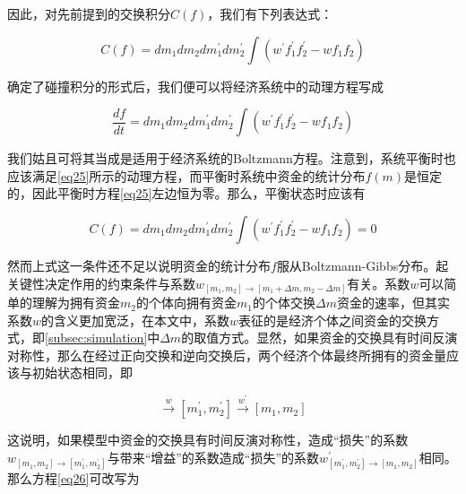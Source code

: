 \documentclass[tsinghuacite]{HustGraduPaper}
\begin{document}
		因此，对先前提到的交换积分$C(f)$，我们有下列表达式：
		
		\begin{equation}
			C(f) = dm_1 dm_2 dm_1^{'} dm_2^{'} \int  ( w^{'} f_{1}^{'} f_{2}^{'} - w f_{1} f_{2} )   \label{eq24}
		\end{equation}
		
		\vspace{1.5em}  
		
		确定了碰撞积分的形式后，我们便可以将经济系统中的动理方程写成
		
		\begin{equation}
			\frac{df}{dt} = dm_1 dm_2 dm_1^{'} dm_2^{'} \int  ( w^{'} f_{1}^{'} f_{2}^{'} - w f_{1} f_{2} )   \label{eq25}
		\end{equation}
		
		\vspace{1.5em}  
		
		我们姑且可将其当成是适用于经济系统的Boltzmann方程。注意到，系统平衡时也应该满足\eqref{eq25}所示的动理方程，而平衡时系统中资金的统计分布$f(m)$是恒定的，因此平衡时方程\eqref{eq25}左边恒为零。那么，平衡状态时应该有
		
		\begin{equation}
			C(f) = dm_1 dm_2 dm_1^{'} dm_2^{'} \int  ( w^{'} f_{1}^{'} f_{2}^{'} - w f_{1} f_{2} ) = 0  \label{eq26}
		\end{equation}
		
		\vspace{1.5em}  
		
		然而上式这一条件还不足以说明资金的统计分布$f$服从Boltzmann-Gibbs分布。起关键性决定作用的约束条件与系数$w_{[m_1,m_2] \rightarrow [m_1 + \Delta m, m_2 - \Delta m]}$有关。系数$w$可以简单的理解为拥有资金$m_2$的个体向拥有资金$m_1$的个体交换$\Delta m$资金的速率，但其实系数$w$的含义更加宽泛，在本文中，系数$w$表征的是经济个体之间资金的交换方式，即\autoref{subsec:simulation}中$\Delta m$的取值方式。显然，如果资金的交换具有时间反演对称性，那么在经过正向交换和逆向交换后，两个经济个体最终所拥有的资金量应该与初始状态相同，即
		
		\begin{equation}
			[m_1,m_2] \stackrel{w}{\longrightarrow} [m_1^{'}, m_2^{'}]  \stackrel{w^{'}}{\longrightarrow}   [m_1, m_2]  \label{eq27}
		\end{equation}
	
		\vspace{1.5em} 
		
		这说明，如果模型中资金的交换具有时间反演对称性，造成“损失”的系数$w_{[m_1, m_2]\rightarrow[m_1^{'}, m_2^{'}]}$与带来“增益”的系数造成“损失”的系数$w^{'}_{ [m_1^{'}, m_2^{'}] \rightarrow [m_1, m_2] }$相同。那么方程\eqref{eq26}可改写为
		
\end{document}
